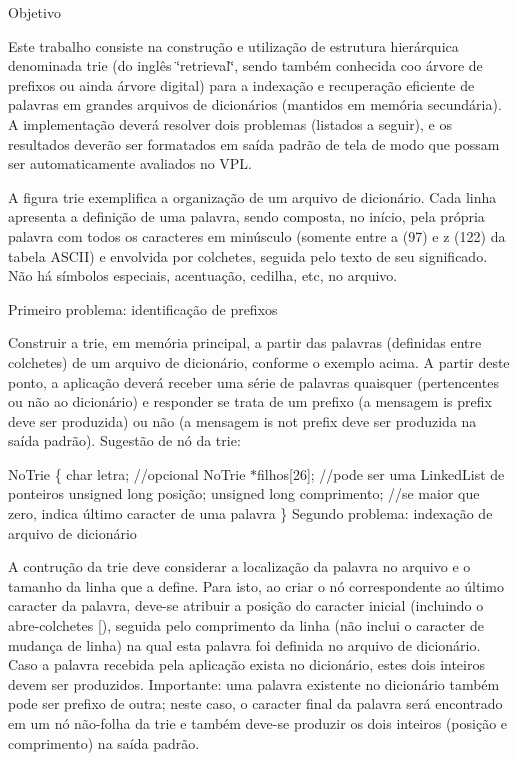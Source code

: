 Objetivo

Este trabalho consiste na construção e utilização de estrutura hierárquica denominada trie (do inglês \char`\"{}retrieval\char`\"{}, sendo também conhecida coo árvore de prefixos ou ainda árvore digital) para a indexação e recuperação eficiente de palavras em grandes arquivos de dicionários (mantidos em memória secundária). A implementação deverá resolver dois problemas (listados a seguir), e os resultados deverão ser formatados em saída padrão de tela de modo que possam ser automaticamente avaliados no V\+PL.

A figura trie exemplifica a organização de um arquivo de dicionário. Cada linha apresenta a definição de uma palavra, sendo composta, no início, pela própria palavra com todos os caracteres em minúsculo (somente entre \textquotesingle{}a\textquotesingle{} (97) e \textquotesingle{}z\textquotesingle{} (122) da tabela A\+S\+C\+II) e envolvida por colchetes, seguida pelo texto de seu significado. Não há símbolos especiais, acentuação, cedilha, etc, no arquivo.

Primeiro problema\+: identificação de prefixos

Construir a trie, em memória principal, a partir das palavras (definidas entre colchetes) de um arquivo de dicionário, conforme o exemplo acima. A partir deste ponto, a aplicação deverá receber uma série de palavras quaisquer (pertencentes ou não ao dicionário) e responder se trata de um prefixo (a mensagem \textquotesingle{}is prefix\textquotesingle{} deve ser produzida) ou não (a mensagem \textquotesingle{}is not prefix\textquotesingle{} deve ser produzida na saída padrão). Sugestão de nó da trie\+:

No\+Trie \{ char letra; //opcional No\+Trie $\ast$filhos\mbox{[}26\mbox{]}; //pode ser uma \textquotesingle{}Linked\+List\textquotesingle{} de ponteiros unsigned long posição; unsigned long comprimento; //se maior que zero, indica último caracter de uma palavra \} Segundo problema\+: indexação de arquivo de dicionário

A contrução da trie deve considerar a localização da palavra no arquivo e o tamanho da linha que a define. Para isto, ao criar o nó correspondente ao último caracter da palavra, deve-\/se atribuir a posição do caracter inicial (incluindo o abre-\/colchetes \textquotesingle{}\mbox{[}\textquotesingle{}), seguida pelo comprimento da linha (não inclui o caracter de mudança de linha) na qual esta palavra foi definida no arquivo de dicionário. Caso a palavra recebida pela aplicação exista no dicionário, estes dois inteiros devem ser produzidos. Importante\+: uma palavra existente no dicionário também pode ser prefixo de outra; neste caso, o caracter final da palavra será encontrado em um nó não-\/folha da trie e também deve-\/se produzir os dois inteiros (posição e comprimento) na saída padrão.

